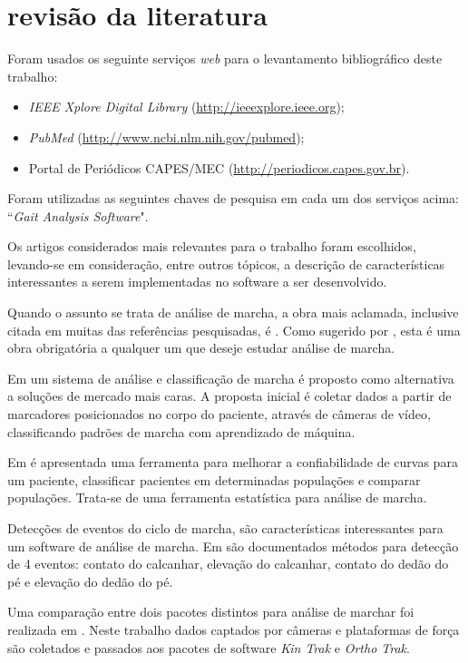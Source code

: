 \section[REVISÃO DA LITERATURA]{revisão da literatura}
Foram usados os seguinte serviços \emph{web} para o levantamento bibliográfico deste trabalho:
\begin{itemize}
	\item \emph{IEEE Xplore Digital Library} (\href{http://ieeexplore.ieee.org}{http://ieeexplore.ieee.org});
	\item \emph{PubMed} (\href{http://www.ncbi.nlm.nih.gov/pubmed}{http://www.ncbi.nlm.nih.gov/pubmed});
	\item Portal de Periódicos CAPES/MEC (\href{http://periodicos.capes.gov.br}{http://periodicos.capes.gov.br}).
\end{itemize}

Foram utilizadas as seguintes chaves de pesquisa em cada um dos serviços acima: ``\emph{Gait Analysis Software}".

Os artigos considerados mais relevantes para o trabalho foram escolhidos, levando-se em consideração, entre outros tópicos, a descrição de características interessantes a serem implementadas no software a ser desenvolvido.

Quando o assunto se trata de análise de marcha, a obra mais aclamada, inclusive citada em muitas das referências pesquisadas, é \cite{Perry2010}.
Como sugerido por \cite{Malas}, esta é uma obra obrigatória a qualquer um que deseje estudar análise de marcha.

Em \cite{Vieira2015} um sistema de análise e classificação de marcha é proposto como alternativa a soluções de mercado mais caras.
A proposta inicial é coletar dados a partir de marcadores posicionados no corpo do paciente, através de câmeras de vídeo, classificando padrões de marcha com aprendizado de máquina.

Em \cite{Duhamel2004} é apresentada uma ferramenta para melhorar a confiabilidade de curvas para um paciente, classificar pacientes em determinadas populações e comparar populações.
Trata-se de uma ferramenta estatística para análise de marcha.

Detecções de eventos do ciclo de marcha, são características interessantes para um software de análise de marcha. 
Em \cite{Ghoussayni2004} são documentados métodos para detecção de 4 eventos: contato do calcanhar, elevação do calcanhar, contato do dedão do pé e elevação do dedão do pé.

Uma comparação entre dois pacotes distintos para análise de marchar foi realizada em \cite{Moraes2003}. 
Neste trabalho dados captados por câmeras e plataformas de força são coletados e passados aos pacotes de software \emph{Kin Trak} e \emph{Ortho Trak}.

